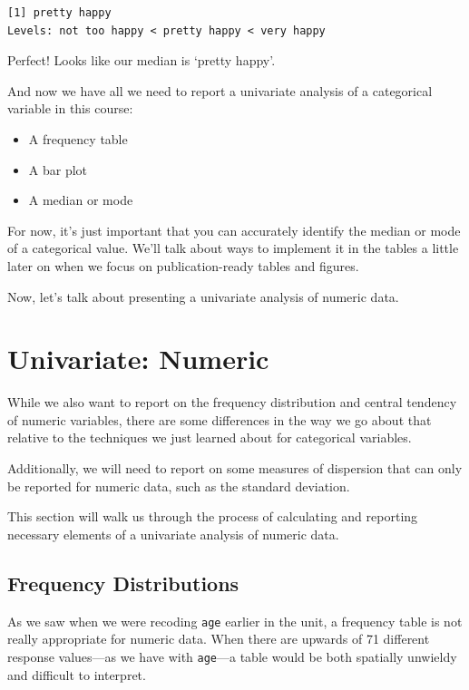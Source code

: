 \documentclass[
  letterpaper,
  DIV=11,
  numbers=noendperiod]{scrreprt}
\providecommand{\tightlist}{%
  \setlength{\itemsep}{0pt}\setlength{\parskip}{0pt}}
\begin{document}
\begin{verbatim}
[1] pretty happy
Levels: not too happy < pretty happy < very happy
\end{verbatim}

Perfect! Looks like our median is `pretty happy'.

And now we have all we need to report a univariate analysis of a
categorical variable in this course:

\begin{itemize}
\tightlist
\item
  A frequency table
\item
  A bar plot
\item
  A median or mode
\end{itemize}

For now, it's just important that you can accurately identify the median
or mode of a categorical value. We'll talk about ways to implement it in
the tables a little later on when we focus on publication-ready tables
and figures.

Now, let's talk about presenting a univariate analysis of numeric data.

\chapter{Univariate: Numeric}\label{univariate-numeric}

While we also want to report on the frequency distribution and central
tendency of numeric variables, there are some differences in the way we
go about that relative to the techniques we just learned about for
categorical variables.

Additionally, we will need to report on some measures of dispersion that
can only be reported for numeric data, such as the standard deviation.

This section will walk us through the process of calculating and
reporting necessary elements of a univariate analysis of numeric data.

\section{Frequency Distributions}\label{frequency-distributions-1}

As we saw when we were recoding \texttt{age} earlier in the unit, a
frequency table is not really appropriate for numeric data. When there
are upwards of 71 different response values---as we have with
\texttt{age}---a table would be both spatially unwieldy and difficult to
interpret.
\end{document}
